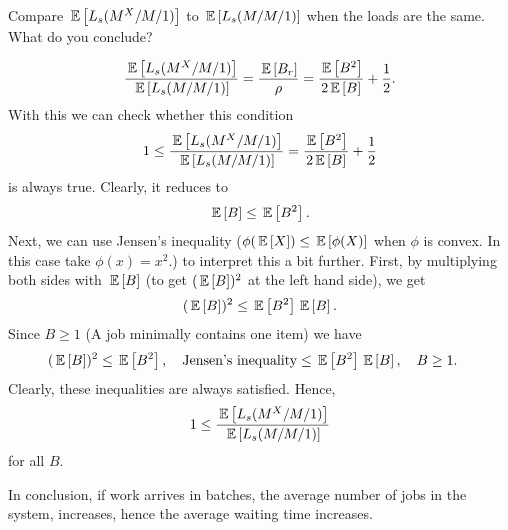 \begin{question}
  Compare $\,\mathbb{E}\left[L_s(M^X/M/1)\right]$ to $\,\mathbb{E}\left[L_s(M/M/1)\right]$ when the loads are the
    same. What do you conclude?

  \begin{solution}
    \begin{equation*}
    \frac{\,\mathbb{E}\left[L_s(M^X/M/1)\right]}{\,\mathbb{E}\left[L_s(M/M/1)\right]} = \frac{\,\mathbb{E}\left[B_r\right]}{\rho} = 
\frac{\,\mathbb{E}\left[B^2\right]}{2\,\mathbb{E}\left[B\right]} + \frac 12.
    \end{equation*}
With this we can check whether this condition
    \begin{equation*}
    1\leq \frac{\,\mathbb{E}\left[L_s(M^X/M/1)\right]}{\,\mathbb{E}\left[L_s(M/M/1)\right]} = \frac{\,\mathbb{E}\left[B^2\right]}{2\,\mathbb{E}\left[B\right]} + \frac 12
    \end{equation*}
    is always true. Clearly, it reduces to
\begin{equation*}
\,\mathbb{E}\left[B\right] \leq  \,\mathbb{E}\left[B^2\right].
\end{equation*}
Next, we can use Jensen's inequality ($\phi(\,\mathbb{E}\left[X\right]) \leq \,\mathbb{E}\left[\phi(X)\right]$
when $\phi$ is convex. In this case take $\phi(x)=x^2$.) to interpret
this a bit further. First, by multiplying both sides with $\,\mathbb{E}\left[B\right]$ (to
get $(\,\mathbb{E}\left[B\right])^2$ at the left hand side), we get
\begin{equation*}
(\,\mathbb{E}\left[B\right])^2 \leq  \,\mathbb{E}\left[B^2\right] \,\mathbb{E}\left[B\right].
\end{equation*}
Since $B\geq 1$ (A job minimally contains one item) we have
\begin{equation*}
  \begin{split}
(\,\mathbb{E}\left[B\right])^2 
&\leq  \,\mathbb{E}\left[B^2\right], \quad{\text{Jensen's inequality}}
\leq   \,\mathbb{E}\left[B^2\right] \,\mathbb{E}\left[B\right], \quad{B \geq 1}.
  \end{split}
\end{equation*}
Clearly, these inequalities are always satisfied. Hence, 
    \begin{equation*}
    1\leq \frac{\,\mathbb{E}\left[L_s(M^X/M/1)\right]}{\,\mathbb{E}\left[L_s(M/M/1)\right]}
    \end{equation*}
for all $B$. 

In conclusion, if work arrives in batches, the average number of jobs
in the system, increases, hence the average waiting time increases.

  \end{solution}
\end{question}


